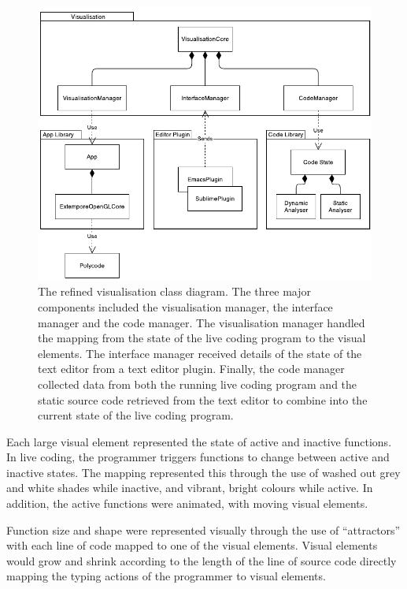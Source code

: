 \begin{figure}
  \centering \includegraphics[width=\columnwidth]{../images/diagrams/visualisation-class-diagram.pdf}
  \caption[The refined visualisation class diagram]{The refined visualisation class diagram. The three major components included the visualisation manager, the interface manager and the code manager. The visualisation manager handled the mapping from the state of the live coding program to the visual elements. The interface manager received details of the state of the text editor from a text editor plugin. Finally, the code manager collected data from both the running live coding program and the static source code retrieved from the text editor to combine into the current state of the live coding program.}
\label{fig:visualisation-class-diagram}
\end{figure}

Each large visual element represented the state of active and inactive functions. In live coding, the programmer triggers functions to change between active and inactive states. The mapping represented this through the use of washed out grey and white shades while inactive, and vibrant, bright colours while active. In addition, the active functions were animated, with moving visual elements.

Function size and shape were represented visually through the use of ``attractors'' with each line of code mapped to one of the visual elements. Visual elements would grow and shrink according to the length of the line of source code directly mapping the typing actions of the programmer to visual elements.  


